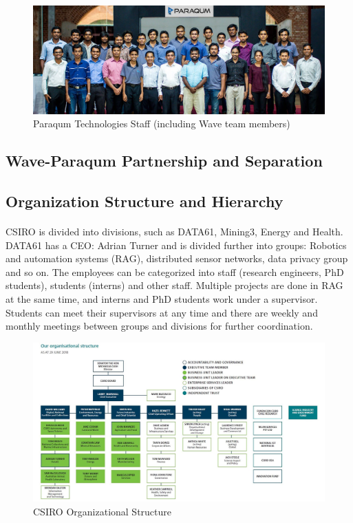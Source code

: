 \begin{figure}[h]
    \centering
    \includegraphics[trim=0cm 0cm 0cm 0cm, clip=true,scale=0.25]{figures/paraqum_team.jpg}
    \caption{Paraqum Technologies Staff (including Wave team members)~\cite{pqmintro} \label{Fig:pqmteam}}\vspace{-4mm}
    \end{figure}

\subsection{Wave-Paraqum Partnership and Separation}

\subsection{Organization Structure and Hierarchy}

\paragraph{}
CSIRO is divided into divisions, such as DATA61, Mining3, Energy and Health. DATA61 has a CEO: Adrian Turner and is divided further into groups: Robotics and automation systems (RAG), distributed sensor networks, data privacy group and so on. The employees can be categorized into staff (research engineers, PhD students), students (interns) and other staff. Multiple projects are done in RAG at the same time, and interns and PhD students work under a supervisor. Students can meet their supervisors at any time and there are weekly and monthly meetings between groups and divisions for further coordination.

\begin{figure}[h]
    \centering
    \includegraphics[width=16cm]{figures/csiro_struct.jpg}
    \caption{CSIRO Organizational Structure}\vspace{-4mm}
\end{figure}

